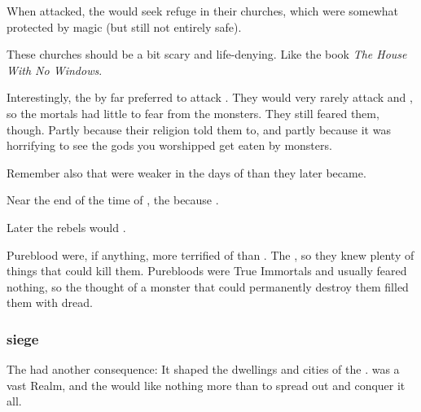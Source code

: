 When \umbrae{} attacked, the \resphain{} would seek refuge in their churches, which were somewhat protected by magic (but still not entirely safe). 


These churches should be a bit scary and life-denying. 
Like the book \emph{The House With No Windows}. 

Interestingly, the \umbrae{} by far preferred to attack \resphain. 
They would very rarely attack \nephilim{} and \humans, so the mortals had little to fear from the monsters. 
They still feared them, though. 
Partly because their religion told them to, and partly because it was horrifying to see the gods you worshipped get eaten by monsters. 

Remember also that \resphain{} were weaker in the days of \Merkyrah{} than they later became.

Near the end of the time of \Merkyrah, the  because . 

Later the rebels would . 

Pureblood \resphain were, if anything, more terrified of \umbrae than \bezedeth. 
The \bezedeth {}, so they knew plenty of things that could kill them. 
Purebloods were True Immortals and usually feared nothing, so the thought of a monster that could permanently destroy them filled them with dread. 





\subsubsection{\Umbra{} siege}
The  had another consequence: 
It shaped the dwellings and cities of the \resphain. 
\Nyx{} was a vast Realm, and the \resphain{} would like nothing more than to spread out and conquer it all. 

